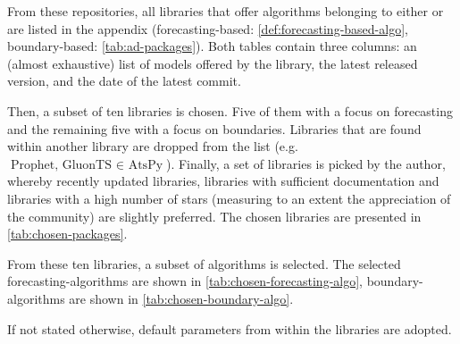 From these repositories, all libraries that offer algorithms belonging to either
 or 
are listed in the appendix (forecasting-based: \cref{def:forecasting-based-algo},
boundary-based: \cref{tab:ad-packages}). Both tables contain three columns:
an (almost exhaustive) list of models offered by the library, the latest
released version, and the date of the latest commit.

Then, a subset of ten libraries is chosen. Five of them with a focus on forecasting
and the remaining five with a focus on boundaries. Libraries that are found within
another library are dropped from the list (e.g.\ \(\text{Prophet, GluonTS } \in \text{ AtsPy}\)).
Finally, a set of libraries is picked by the author, whereby recently updated libraries,
libraries with sufficient documentation and libraries with a high number of
stars (measuring to an extent the appreciation of the community) are slightly
preferred. The chosen libraries are presented in \cref{tab:chosen-packages}.

From these ten libraries, a subset of algorithms is selected. The selected
forecasting-algorithms are shown in \cref{tab:chosen-forecasting-algo},
boundary-algorithms are shown in \cref{tab:chosen-boundary-algo}.

If not stated otherwise, default parameters from within the libraries are adopted.
